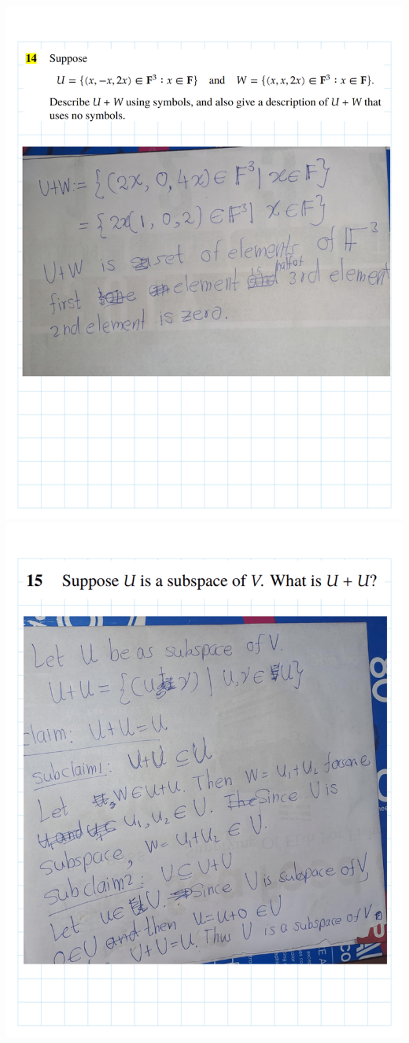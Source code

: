 \documentclass[
]{book}
\theoremstyle{definition}
\theoremstyle{definition}
\theoremstyle{definition}
\theoremstyle{definition}
\theoremstyle{remark}
\begin{document}
\begin{enumerate}
  \includegraphics{fig/Ex1C/Ex/Ex-16.png}
  \includegraphics{fig/Ex1C/Ex/Ex-17.png}

\end{enumerate}
\end{document}
